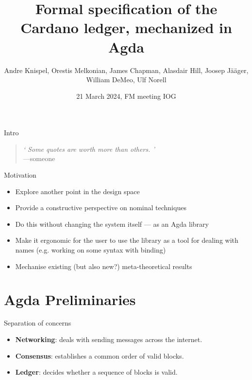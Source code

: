 \documentclass[aspectratio=169]{beamer}
\title{%
Formal specification of the Cardano ledger,
mechanized in Agda}
\author{Andre Knispel, \alert{Orestis Melkonian}, James Chapman,
Alasdair Hill, Joosep Jääger, William DeMeo, Ulf Norell}
\date{21 March 2024, FM meeting \@ IOG}
\newcommand\myblockquote[2]{%
  \blockquote{\hspace*{2em}\emph{`#1'}#2}\par}
\renewcommand\alert[1]{\textcolor{mLightBrown}{#1}}
\begin{document}
\AgdaNoSpaceAroundCode{}



\begin{center}
\maketitle
\end{center}



\begin{frame}{Intro}
\myblockquote{\textit{
Some quotes are worth more than others.
}}{\\---someone}
\end{frame}

\begin{frame}{Motivation}
\begin{itemize}
\item Explore another \alert{point in the design space}
\item Provide a \alert{constructive} perspective on nominal techniques
\item Do this \alert{without changing the system itself} --- as an Agda library
\item Make it \alert{ergonomic} for the user to use the library as a tool for dealing with names
(e.g. working on some syntax with binding)
\item Mechanise existing (but also new?) \alert{meta-theoretical results}
\end{itemize}
\end{frame}

\section{Agda Preliminaries}

\begin{frame}{Separation of concerns}
\begin{itemize}
\item \textbf{Networking}: deals with sending messages across the internet.
\item \textbf{Consensus}: establishes a common order of valid blocks.
\item \textbf{Ledger}: decides whether a sequence of blocks is valid.
\end{itemize}
\end{frame}
\end{document}
